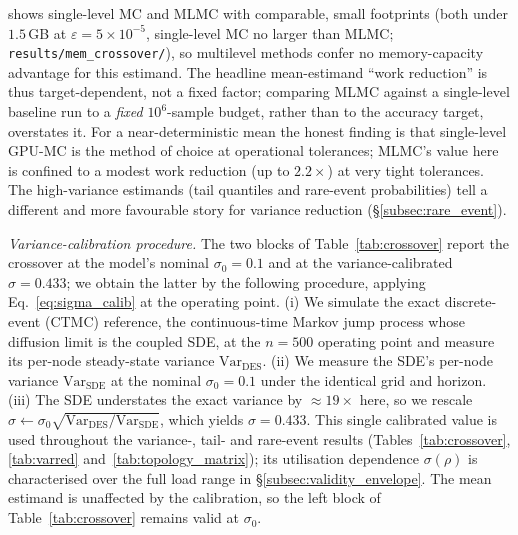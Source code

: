 \documentclass{ieeeaccess}
\begin{document}
shows single-level MC and MLMC with comparable, small footprints (both under $1.5$\,GB at
$\varepsilon{=}5\times10^{-5}$, single-level MC no larger than MLMC; \texttt{results/mem\_crossover/}),
so multilevel methods confer no memory-capacity advantage for this estimand. The headline
mean-estimand ``work reduction'' is thus target-dependent, not a fixed factor; comparing MLMC against a single-level baseline run
to a \emph{fixed} $10^6$-sample budget, rather than to the accuracy target, overstates it. For a near-deterministic mean the honest
finding is that single-level GPU-MC is the method of choice at operational tolerances; MLMC's
value here is confined to a modest work reduction (up to $2.2\times$) at very tight tolerances. The high-variance
estimands (tail quantiles and rare-event probabilities) tell a different and more favourable
story for variance reduction (\S\ref{subsec:rare_event}).

\textit{Variance-calibration procedure.}
The two blocks of Table~\ref{tab:crossover} report the crossover at the model's nominal
$\sigma_0{=}0.1$ and at the variance-calibrated $\sigma{=}0.433$; we obtain the latter by the
following procedure, applying Eq.~\eqref{eq:sigma_calib} at the operating point. (i) We simulate
the exact discrete-event (CTMC) reference, the continuous-time Markov jump process whose
diffusion limit is the coupled SDE, at the $n{=}500$ operating point and measure its per-node
steady-state variance $\mathrm{Var}_{\mathrm{DES}}$.
(ii) We measure the SDE's per-node variance $\mathrm{Var}_{\mathrm{SDE}}$ at the nominal
$\sigma_0{=}0.1$ under the identical grid and horizon. (iii) The SDE understates the exact
variance by ${\approx}19\times$ here, so we rescale
$\sigma\!\leftarrow\!\sigma_0\sqrt{\mathrm{Var}_{\mathrm{DES}}/\mathrm{Var}_{\mathrm{SDE}}}$,
which yields $\sigma{=}0.433$. This single calibrated value is used throughout the
variance-, tail- and rare-event results (Tables~\ref{tab:crossover}, \ref{tab:varred}
and~\ref{tab:topology_matrix}); its utilisation dependence $\sigma(\rho)$ is characterised over
the full load range in \S\ref{subsec:validity_envelope}. The mean estimand is unaffected by the
calibration, so the left block of Table~\ref{tab:crossover} remains valid at $\sigma_0$.
\end{document}
